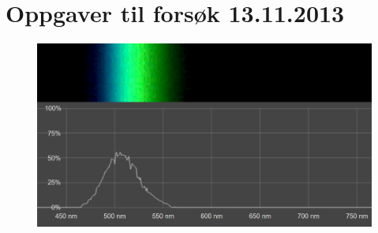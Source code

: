 
\chapter{Oppgaver til forsøk 13.11.2013}
\label{assignments}
\begin{figure}[H]
\centering
\includegraphics[width=\textwidth]{img/photosynthesis/spectrometer.png}
\end{figure}
